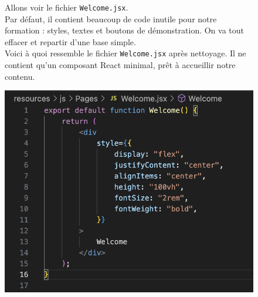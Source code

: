 \begin{figure}[H]
  \centering
  \begin{minipage}[t]{0.50\textwidth}
    \vspace{0pt}\raggedright
    Allons voir le fichier \verb|Welcome.jsx|. \\
    Par défaut, il contient beaucoup de code inutile pour notre formation : styles, textes et boutons de démonstration.  
    On va tout effacer et repartir d’une base simple.\\
    Voici à quoi ressemble le fichier \verb|Welcome.jsx| après nettoyage.
    Il ne contient qu’un composant React minimal, prêt à accueillir notre contenu.
  \end{minipage}\hfill
  \begin{minipage}[t]{0.40\textwidth} 
    \vspace{0pt}\centering
    \includegraphics[width=0.9\linewidth]{figures-C1/welcome_jsx_empty.png} %
  \end{minipage}
\end{figure}

